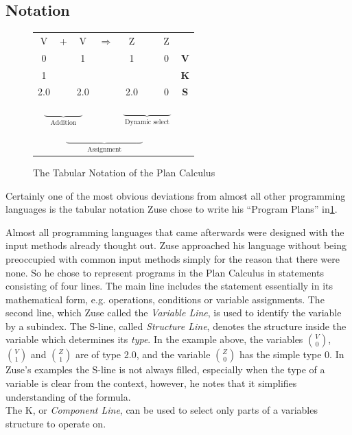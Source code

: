 \documentclass{llncs}
\begin{document}
 \subsection{Notation}
 \begin{figure}[tb]
   \begin{center}
     \begin{tabular}[bt]{c c c c c c c | c}
       V & + & V & $\Rightarrow$ & Z & {\LARGE\multirow{3}{*}{$\swarrow$}} & Z & ~\\
       0 &   & 1 &               & 1 &   & 0 & {\bf V}\\
       1 &   &   &               &   & &   & {\bf K}\\
       2.0 & & 2.0 &             & 2.0 & & 0 & {\bf S} \\
       \multicolumn{3}{c}{$\underbrace{\qquad\qquad}_{\text{Addition}}$}
       	& & \multicolumn{3}{c}{$\underbrace{\qquad\qquad\quad}_{\text{Dynamic select}}$} \\
	\multicolumn{7}{c}{$\underbrace{\qquad\qquad\qquad\qquad}_{\text{Assignment}}$} &
     \end{tabular}
   \end{center}
   \caption{The Tabular Notation of the Plan Calculus}
   \label{fig:notation}
 \end{figure}
   Certainly one of the most obvious deviations from almost all other programming 
   languages is the tabular notation Zuse chose to write his ``Program Plans'' in\ref{fig:notation}. 
   
   Almost all programming languages that came afterwards were designed with the input
   methods already thought out. Zuse approached his language without being preoccupied 
   with common input methods simply for the reason that there were none. So he chose 
   to represent programs in the Plan Calculus in statements consisting of four lines. 
   The main line includes the statement essentially in its mathematical form, 
   e.g. operations, conditions or variable assignments.
   The second line, which Zuse called the \emph{Variable Line}, is used to identify 
   the variable by a subindex. The S-line, called \emph{Structure Line}, denotes the 
   structure inside the variable which determines its \emph{type}. In the example above, the variables 
   $\binom{V}{0}$, $\binom{V}{1}$ and $\binom{Z}{1}$ are of type 2.0, and the variable $\binom{Z}{0}$
   has the simple type 0. In Zuse's examples the S-line is not always filled, especially when the 
   type of a variable is clear from the context, however, he notes that it simplifies understanding 
   of the formula\cite{bauer1972plankalkuel}.\\
   The K, or \emph{Component Line}, can be used to select only parts of a variables structure to operate 
   on.
\end{document}
